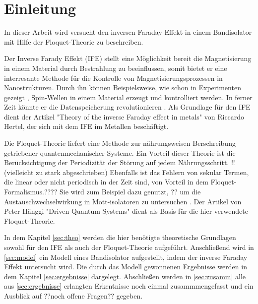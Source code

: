 \chapter{Einleitung}
In dieser Arbeit wird versucht
den inversen Faraday Effekt
in einem Bandisolator mit
Hilfe der Floquet-Theorie
zu beschreiben.

Der Inverse Farady Effekt (IFE) stellt eine Möglichkeit bereit
die Magnetisierung in einem Material
durch Bestrahlung zu beeinflussen,
somit bietet er eine interresante Methode für die
Kontrolle von Magnetisierungsprozessen in Nanostrukturen.
Durch ihn können Beispielsweise, wie schon
in Experimenten gezeigt \cite{E2},
Spin-Wellen in einem Material erzeugt und kontrolliert werden.
In ferner Zeit könnte er die
Datenspeicherung revolutionieren \cite{hertel}.
Als Grundlage für den IFE dient der Artikel
"Theory of the inverse Faraday effect
 in metals" \cite{hertel} von Riccardo
Hertel, der sich mit dem IFE im Metallen
beschäftigt.

Die Floquet-Theorie liefert eine Methode
zur nährungsweisen Berschreibung
getriebener quantenmechanischer Systeme.
Ein Vorteil dieser Theorie ist
die Berücksichtigung der Periodizität
der Störung auf jedem Nährungsschritt.
!!(vielleicht zu stark abgeschrieben)
Ebenfalls ist das Fehlern von
sekular Termen, die linear oder nicht
periodisch in der Zeit sind, von Vorteil
in dem Floquet-Formalismus.??\cite{haenggi}??
Sie wird zum Beispiel
dazu genutzt, ?? um die Austauschwechselwirkung
in Mott-isolatoren zu untersuchen \cite{mentink}.
Der Artikel von Peter Hänggi
"Driven Quantum Systems" \cite{haenggi}
dient als Basis für die hier verwendete Floquet-Theorie.


In dem Kapitel \ref{sec:theo} werden die hier benötigte
theoretische Grundlagen sowohl für den IFE als auch der Floquet-Theorie aufgeführt.
Anschließend wird in \ref{sec:model} ein Modell eines Bandisolator aufgestellt,
indem der inverse Faraday Effekt untersucht wird.
Die durch das Modell gewonnenen Ergebnisse werden in dem Kapitel \ref{sec:ergebnisse} dargelegt.
Abschließen werden in \ref{sec:zusamm} alle aus \ref{sec:ergebnisse} erlangten Erkentnisse noch einmal zusammmengefasst und ein Ausblick
auf ??noch offene Fragen?? gegeben.







